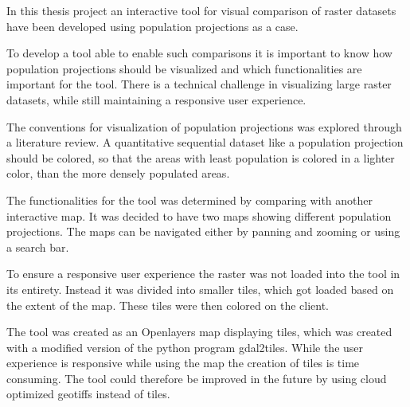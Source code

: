 

In this thesis project an interactive tool for visual comparison of raster datasets have been developed using population projections as a case. 

To develop a tool able to enable such comparisons it is important to know how population projections should be visualized and which functionalities are important for the tool. There is a technical challenge in visualizing large raster datasets, while still maintaining a responsive user experience.

The conventions for visualization of population projections was explored through a literature review. A quantitative sequential dataset like a population projection should be colored, so that the areas with least population is colored in a lighter color, than the more densely populated areas. 

The functionalities for the tool was determined by comparing with another interactive map. It was decided to have two maps showing different population projections. The maps can be navigated either by panning and zooming or using a search bar. 

To ensure a responsive user experience the raster was not loaded into the tool in its entirety. Instead it was divided into smaller tiles, which got loaded based on the extent of the map. These tiles were then colored on the client.

The tool was created as an Openlayers map displaying tiles, which was created with a modified version of the python program gdal2tiles.
While the user experience is responsive while using the map the creation of tiles is time consuming. The tool could therefore be improved in the future by using cloud optimized geotiffs instead of tiles.
